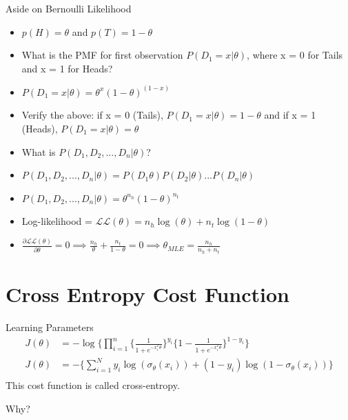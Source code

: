 \documentclass{beamer}
\begin{document}
\begin{frame}{Aside on Bernoulli Likelihood}
\begin{itemize}[<+->]
\item $p(H) = \theta$ and $p(T) = 1 - \theta$
\item What is the PMF for first observation $P(D_1 = x|\theta)$, where x = 0 for Tails and x = 1 for Heads?
\item $P(D_1 = x|\theta) = \theta^x(1-\theta)^{(1-x)}$
\item Verify the above: if x = 0 (Tails), $P(D_1 = x|\theta) = 1 - \theta$ and if x = 1 (Heads), $P(D_1 = x|\theta)  = \theta$
\item What is $P(D_1, D_2, ..., D_n|\theta)$?
\item $P(D_1, D_2, ..., D_n|\theta) = P(D_1\theta)P(D_2|\theta)...P(D_n|\theta)$
\item $P(D_1, D_2, ..., D_n|\theta) =\theta^{n_h}(1-\theta)^{n_t}$
\item Log-likelihood = $\mathcal{LL}(\theta) = n_h\log(\theta) + n_t\log(1-\theta)$
\item $\frac{\partial \mathcal{LL}(\theta)}{\partial \theta} = 0 \implies \frac{n_h}{\theta} + \frac{n_t}{1-\theta} = 0 \implies \theta_{MLE} = \frac{n_h}{n_h + n_t}$

\end{itemize}

\end{frame}

\section{Cross Entropy Cost Function}
\begin{frame}{Learning Parameters}
\begin{align*}
J(\theta) &= -\log \bigg\{\prod_{i=1}^{n} \Big\{\frac{1}{1 + e^{-x_{i}^T\theta}}\Big\}^{y_{i}}\Big\{1 - \frac{1}{1 + e^{-x_{i}^T\theta}}\Big\}^{1 - y_{i}}\bigg\}\\
J(\theta) &= -\bigg\{\sum_{i=1}^{N} y_{i} \log(\sigma_{\theta}(x_{i})) + (1 - y_{i})\log(1 - \sigma_{\theta}(x_{i}))\bigg\} \\
\end{align*}
\pause This cost function is called cross-entropy.

\pause Why?
\end{frame}
\end{document}

